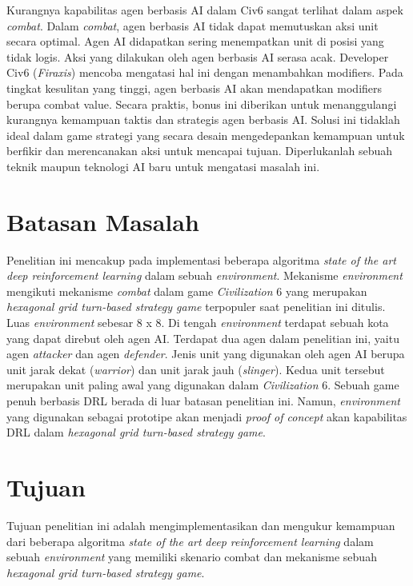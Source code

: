 Kurangnya kapabilitas agen berbasis AI dalam Civ6 sangat terlihat dalam aspek \emph{combat}. 
Dalam \emph{combat}, agen berbasis AI tidak dapat memutuskan aksi unit secara optimal. 
Agen AI didapatkan sering menempatkan unit di posisi yang tidak logis. 
Aksi yang dilakukan oleh agen berbasis AI serasa acak. 
Developer Civ6 (\emph{Firaxis}) mencoba mengatasi hal ini dengan menambahkan modifiers. 
Pada tingkat kesulitan yang tinggi, agen berbasis AI akan mendapatkan modifiers berupa combat value. 
Secara praktis, bonus ini diberikan untuk menanggulangi kurangnya kemampuan taktis dan strategis agen berbasis AI. 
Solusi ini tidaklah ideal dalam game strategi yang secara desain mengedepankan kemampuan untuk berfikir dan merencanakan aksi untuk mencapai tujuan.
Diperlukanlah sebuah teknik maupun teknologi AI baru untuk mengatasi masalah ini.

\section{Batasan Masalah}
\label{sec:batasanmasalah}

Penelitian ini mencakup pada implementasi beberapa algoritma \emph{state of the art} \emph{deep reinforcement learning} dalam sebuah \emph{environment}. 
Mekanisme \emph{environment} mengikuti mekanisme \emph{combat} dalam game \emph{Civilization} 6 yang merupakan \emph{hexagonal grid turn-based strategy game} terpopuler saat penelitian ini ditulis. 
Luas \emph{environment} sebesar 8 x 8. Di tengah \emph{environment} terdapat sebuah kota yang dapat direbut oleh agen AI. 
Terdapat dua agen dalam penelitian ini, yaitu agen \emph{attacker} dan agen \emph{defender}. 
Jenis unit yang digunakan oleh agen AI berupa unit jarak dekat (\emph{warrior}) dan unit jarak jauh (\emph{slinger}). 
Kedua unit tersebut merupakan unit paling awal yang digunakan dalam \emph{Civilization} 6.
Sebuah game penuh berbasis DRL berada di luar batasan penelitian ini. 
Namun, \emph{environment} yang digunakan sebagai prototipe akan menjadi \emph{proof of concept} akan kapabilitas DRL dalam \emph{hexagonal grid turn-based strategy game}.

\section{Tujuan}
\label{sec:Tujuan}

Tujuan penelitian ini adalah mengimplementasikan dan mengukur kemampuan dari beberapa 
algoritma \emph{state of the art} \emph{deep reinforcement learning} dalam sebuah \emph{environment} yang memiliki skenario combat dan mekanisme
sebuah \emph{hexagonal grid turn-based strategy game}.


